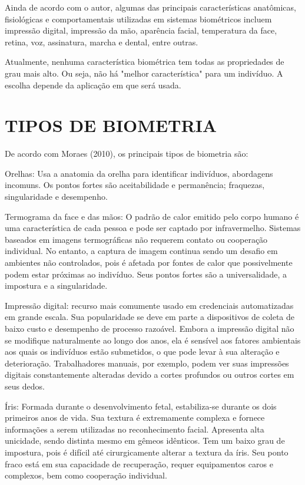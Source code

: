 Ainda de acordo com o autor, algumas das principais características anatômicas, fisiológicas e comportamentais utilizadas em sistemas biométricos incluem impressão digital, impressão da mão, aparência facial, temperatura da face, retina, voz, assinatura, marcha e dental, entre outras.

Atualmente, nenhuma característica biométrica tem todas as propriedades de grau mais alto. Ou seja, não há "melhor característica" para um indivíduo. A escolha depende da aplicação em que será usada.

\section{TIPOS DE BIOMETRIA}\label{sec:formatacaoTexto}

De acordo com Moraes (2010), os principais tipos de biometria são:

Orelhas: Usa a anatomia da orelha para identificar indivíduos, abordagens incomuns. Os pontos fortes são aceitabilidade e permanência; fraquezas, singularidade e desempenho.

Termograma da face e das mãos: O padrão de calor emitido pelo corpo humano é uma característica de cada pessoa e pode ser captado por infravermelho. Sistemas baseados em imagens termográficas não requerem contato ou cooperação individual. No entanto, a captura de imagem continua sendo um desafio em ambientes não controlados, pois é afetada por fontes de calor que possivelmente podem estar próximas ao indivíduo. Seus pontos fortes são a universalidade, a impostura e a singularidade.

Impressão digital: recurso mais comumente usado em credenciais automatizadas em grande escala. Sua popularidade se deve em parte a dispositivos de coleta de baixo custo e desempenho de processo razoável. Embora a impressão digital não se modifique naturalmente ao longo dos anos, ela é sensível aos fatores ambientais aos quais os indivíduos estão submetidos, o que pode levar à sua alteração e deterioração. Trabalhadores manuais, por exemplo, podem ver suas impressões digitais constantemente alteradas devido a cortes profundos ou outros cortes em seus dedos.

Íris: Formada durante o desenvolvimento fetal, estabiliza-se durante os dois primeiros anos de vida. Sua textura é extremamente complexa e fornece informações a serem utilizadas no reconhecimento facial. Apresenta alta unicidade, sendo distinta mesmo em gêmeos idênticos. Tem um baixo grau de impostura, pois é difícil até cirurgicamente alterar a textura da íris. Seu ponto fraco está em sua capacidade de recuperação, requer equipamentos caros e complexos, bem como cooperação individual.

